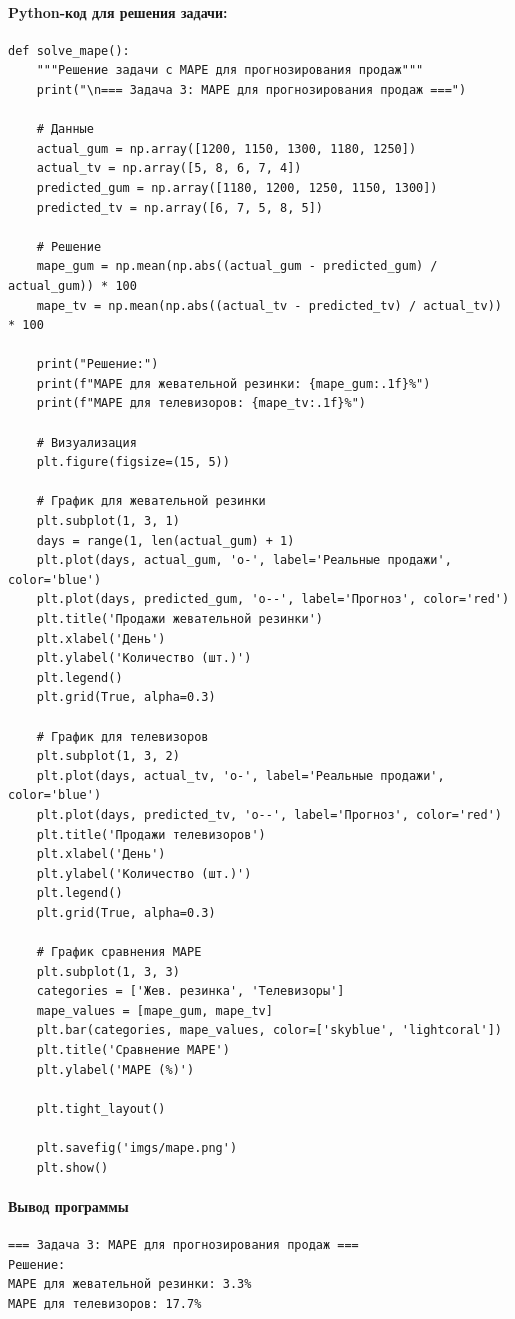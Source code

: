 \documentclass[12pt]{article}
\theoremstyle{definition}
\theoremstyle{definition}
\theoremstyle{definition}
\theoremstyle{remark}
\theoremstyle{remark}
\begin{document}
\paragraph{Python-код для решения задачи:}

\begin{verbatim}
def solve_mape():
    """Решение задачи с MAPE для прогнозирования продаж"""
    print("\n=== Задача 3: MAPE для прогнозирования продаж ===")
    
    # Данные
    actual_gum = np.array([1200, 1150, 1300, 1180, 1250])
    actual_tv = np.array([5, 8, 6, 7, 4])
    predicted_gum = np.array([1180, 1200, 1250, 1150, 1300])
    predicted_tv = np.array([6, 7, 5, 8, 5])
    
    # Решение
    mape_gum = np.mean(np.abs((actual_gum - predicted_gum) / actual_gum)) * 100
    mape_tv = np.mean(np.abs((actual_tv - predicted_tv) / actual_tv)) * 100
    
    print("Решение:")
    print(f"MAPE для жевательной резинки: {mape_gum:.1f}%")
    print(f"MAPE для телевизоров: {mape_tv:.1f}%")
    
    # Визуализация
    plt.figure(figsize=(15, 5))
    
    # График для жевательной резинки
    plt.subplot(1, 3, 1)
    days = range(1, len(actual_gum) + 1)
    plt.plot(days, actual_gum, 'o-', label='Реальные продажи', color='blue')
    plt.plot(days, predicted_gum, 'o--', label='Прогноз', color='red')
    plt.title('Продажи жевательной резинки')
    plt.xlabel('День')
    plt.ylabel('Количество (шт.)')
    plt.legend()
    plt.grid(True, alpha=0.3)
    
    # График для телевизоров
    plt.subplot(1, 3, 2)
    plt.plot(days, actual_tv, 'o-', label='Реальные продажи', color='blue')
    plt.plot(days, predicted_tv, 'o--', label='Прогноз', color='red')
    plt.title('Продажи телевизоров')
    plt.xlabel('День')
    plt.ylabel('Количество (шт.)')
    plt.legend()
    plt.grid(True, alpha=0.3)
    
    # График сравнения MAPE
    plt.subplot(1, 3, 3)
    categories = ['Жев. резинка', 'Телевизоры']
    mape_values = [mape_gum, mape_tv]
    plt.bar(categories, mape_values, color=['skyblue', 'lightcoral'])
    plt.title('Сравнение MAPE')
    plt.ylabel('MAPE (%)')
    
    plt.tight_layout()
    
    plt.savefig('imgs/mape.png')
    plt.show()
\end{verbatim}
\paragraph{Вывод программы}
\begin{verbatim}
=== Задача 3: MAPE для прогнозирования продаж ===
Решение:
MAPE для жевательной резинки: 3.3%
MAPE для телевизоров: 17.7%
\end{verbatim}
\end{document}
